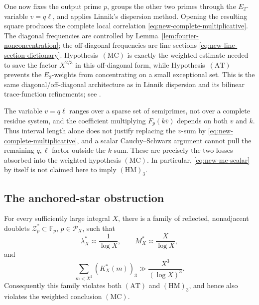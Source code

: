 One now fixes the output prime \(p\), groups the other two primes
through the \(E_2\)-variable \(v=q\ell\), and applies Linnik's
dispersion method.  Opening the resulting square produces the
complete local correlation
\eqref{eq:new-complete-multiplicative}.  The diagonal frequencies are
controlled by Lemma~\ref{lem:fourier-nonconcentration}; the
off-diagonal frequencies are line sections
\eqref{eq:new-line-section-dictionary}.  Hypothesis~\((\mathrm{MC})\)
is exactly the weighted estimate needed to save the factor
\(X^{2/3}\) in this off-diagonal form, while
Hypothesis~\((\mathrm{AT})\) prevents the \(E_2\)-weights from
concentrating on a small exceptional set.  This is the same
diagonal/off-diagonal architecture as in Linnik dispersion and its
bilinear trace-function refinements; see
\cite{FouvryKM2014,KMS2017,Drappeau2017}.

\begin{remark}
\label{rem:new-ced-honesty}
The variable \(v=q\ell\) ranges over a sparse set of semiprimes, not
over a complete residue system, and the coefficient multiplying
\(F_p(k\bar v)\) depends on both \(v\) and \(k\).  Thus interval length
alone does not justify replacing the \(v\)-sum by
\eqref{eq:new-complete-multiplicative}, and a scalar Cauchy--Schwarz
argument cannot pull the remaining \(q,\ell\)-factor outside the
\(k\)-sum.  These are precisely the two losses absorbed into the
weighted hypothesis \((\mathrm{MC})\).  In particular,
\eqref{eq:new-mc-scalar} by itself is not claimed here to imply
\((\mathrm{HM})_3\).
\end{remark}

\subsection{The anchored-star obstruction}

\begin{proposition}
\label{prop:new-anchored-star}
For every sufficiently large integral \(X\), there is a family of
reflected, nonadjacent doublets
\(\mathcal Z_p^*\subset\mathbb F_p\), \(p\in\mathcal P_X\), such that
\[
 \lambda_X^*\asymp\frac1{\log X},
 \qquad
 M_X^*\asymp\frac{X}{\log X},
\]
and
\[
 \sum_{m<X^2}(K_X^*(m))_3
 \gg\frac{X^3}{(\log X)^3}.
\]
Consequently this family violates both \((\mathrm{AT})\) and
\((\mathrm{HM})_3\), and hence also violates the weighted conclusion
\((\mathrm{MC})\).
\end{proposition}

